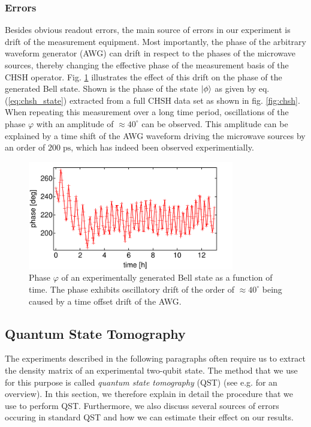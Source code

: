 \subsubsection{Errors} 

Besides obvious readout errors, the main source of errors in our experiment is drift of the measurement equipment. Most importantly, the phase of the arbitrary waveform generator (AWG) can drift in respect to the phases of the microwave sources, thereby changing the effective phase of the measurement basis of the CHSH operator. Fig. \ref{fig:chsh_drift} illustrates the effect of this drift on the phase of the generated Bell state. Shown is the phase of the state $\left| \phi \right>$ as given by eq. (\ref{eq:chsh_state}) extracted from a full CHSH data set as shown in fig. \ref{fig:chsh}. When repeating this measurement over a long time period, oscillations of the phase $\varphi$ with an amplitude of $\approx 40^\circ$ can be observed. This amplitude can be explained by a time shift of the AWG waveform driving the microwave sources by an order of $200\;\mathrm{ps}$, which has indeed been observed experimentially.

\begin{figure}
	\centering
	\includegraphics[width=9cm]{"./data/ct5/2011_03_17 - chsh/chsh_drift"}
	\caption[]{Phase $\varphi$ of an experimentally generated Bell state as a function of time. The phase exhibits oscillatory drift of the order of $\approx 40^\circ$ being caused by a time offset drift of the AWG.}
	\label{fig:chsh_drift}
\end{figure}

\subsection{Quantum State Tomography}

The experiments described in the following paragraphs often require us to extract the density matrix of an experimental two-qubit state. The method that we use for this purpose is called {\it quantum state tomography} (QST) (see e.g. \cite{nielsen_quantum_2000} for an overview). In this section, we therefore explain in detail the procedure that we use to perform QST. Furthermore, we also discuss several sources of errors occuring in standard QST and how we can estimate their effect on our results.

